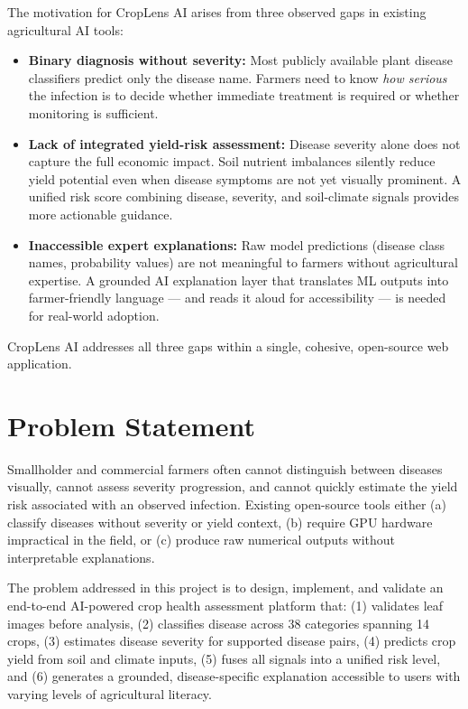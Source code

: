The motivation for CropLens AI arises from three observed gaps in existing agricultural AI tools:

\begin{itemize}
    \item \textbf{Binary diagnosis without severity:} Most publicly available plant disease classifiers predict only the disease name. Farmers need to know \textit{how serious} the infection is to decide whether immediate treatment is required or whether monitoring is sufficient.

    \item \textbf{Lack of integrated yield-risk assessment:} Disease severity alone does not capture the full economic impact. Soil nutrient imbalances silently reduce yield potential even when disease symptoms are not yet visually prominent. A unified risk score combining disease, severity, and soil-climate signals provides more actionable guidance.

    \item \textbf{Inaccessible expert explanations:} Raw model predictions (disease class names, probability values) are not meaningful to farmers without agricultural expertise. A grounded AI explanation layer that translates ML outputs into farmer-friendly language --- and reads it aloud for accessibility --- is needed for real-world adoption.
\end{itemize}

CropLens AI addresses all three gaps within a single, cohesive, open-source web application.

\section{Problem Statement}

Smallholder and commercial farmers often cannot distinguish between diseases visually, cannot assess severity progression, and cannot quickly estimate the yield risk associated with an observed infection. Existing open-source tools either (a) classify diseases without severity or yield context, (b) require GPU hardware impractical in the field, or (c) produce raw numerical outputs without interpretable explanations.

The problem addressed in this project is to design, implement, and validate an end-to-end AI-powered crop health assessment platform that: (1) validates leaf images before analysis, (2) classifies disease across 38 categories spanning 14 crops, (3) estimates disease severity for supported disease pairs, (4) predicts crop yield from soil and climate inputs, (5) fuses all signals into a unified risk level, and (6) generates a grounded, disease-specific explanation accessible to users with varying levels of agricultural literacy.

